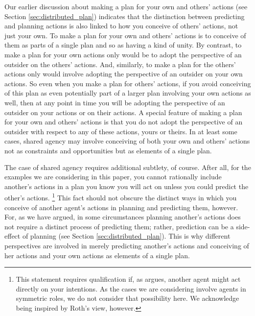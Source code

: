 \documentclass[12pt,\papersize]{extarticle}
\begin{document}
Our earlier discussion about making a plan for your own and others' actions 
(see Section \vref{sec:distributed_plan})
 indicates that 
  the distinction between predicting and planning actions is also linked to how you conceive of others' actions, not just your own.
To make a plan for your own and others' actions is to conceive of them as parts of a single plan and so as having a kind of unity.
By contrast, 
to make a plan for your own actions only would be to adopt the perspective of an outsider on the others' actions.
And, similarly, to make a plan for the others' actions only would involve adopting the perspective of an outsider on your own actions.
So even when you make a plan for others' actions,
if you avoid conceiving of this plan as even potentially part of a larger plan involving your own actions as well,
then
at any point in time you will be adopting the perspective of an outsider on your actions or on their actions.
A special feature of making a plan for your own and others' actions is that you do not adopt the perspective of an outsider with respect to any of these actions, yours or theirs.
In at least some cases, shared agency may involve conceiving of both your own and others' actions not as constraints and opportunities but as elements of a single plan.

The case of shared agency requires additional subtlety, of course.
After all,
for the examples we are considering in this paper,
you cannot rationally include another's actions in a plan you know you will act on unless you could predict the other's actions.%
%
\footnote{
This statement requires qualification if, as \citet{roth_shared_agency} argues, 
another agent might act directly on your intentions. 
As the cases we are considering involve agents in symmetric roles, we do not consider that possibility here.
We acknowledge being inspired by Roth's view,  however.
}
%
This fact should not obscure the distinct ways in which you conceive of another agent's actions in planning and predicting them, however.
For, as we have argued, in some circumstances
	 planning another's actions does not require a distinct process of predicting them; rather, prediction can be a side-effect of planning (see Section \vref{sec:distributed_plan}).
This is why 
different perspectives are involved in 
	merely predicting another's actions 
	and 
	conceiving of her actions and  your own actions as elements of a single plan.
	
\end{document}
